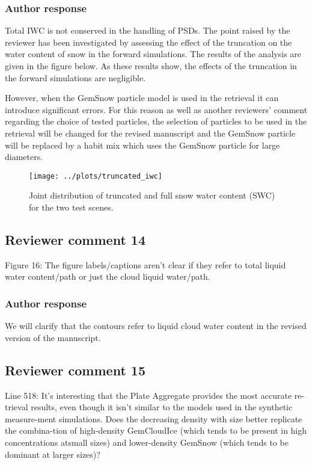 \documentclass[11pt]{scrartcl}
\begin{document}
\subsubsection*{Author response}

Total IWC is not conserved in the handling of PSDs. The point raised by the reviewer has been
investigated by assessing the effect of the truncation on the water content of snow in the
forward simulations. The results of the analysis are given in the figure below. As these results
show, the effects of the truncation in the forward simulations are negligible.

However, when the GemSnow particle model is used in the retrieval it can
introduce significant errors. For this reason as well as another reviewers'
comment regarding the choice of tested particles, the selection of particles to
be used in the retrieval will be changed for the revised manuscript and the
GemSnow particle will be replaced by a habit mix which uses the GemSnow
particle for large diameters.

\begin{figure}[!hbpt]
  \begin{center}
  \texttt{[image: ../plots/truncated\_iwc]}
  \caption{Joint distribution of truncated and full snow water content (SWC) for the
    two test scenes.}
  \end{center}
\end{figure}

\subsection*{Reviewer comment 14}

Figure 16: The figure labels/captions aren't clear if they refer to total liquid
water content/path or just the cloud liquid water/path.

\subsubsection{Author response}

We will clarify that the contours refer to liquid cloud water content in the
revised version of the manuscript.

\subsection*{Reviewer comment 15}

 Line 518: It’s interesting that the Plate Aggregate provides the most accurate
 re-trieval results, even though it isn’t similar to the models used in the
 synthetic measure-ment simulations. Does the decreasing density with size
 better replicate the combina-tion of high-density GemCloudIce (which tends to
 be present in high concentrations atsmall sizes) and lower-density GemSnow
 (which tends to be dominant at larger sizes)?
\end{document}
